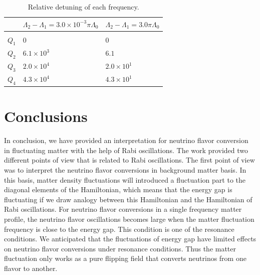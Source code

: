 \documentclass[%
reprint,
 amsmath,amssymb,
 prd,
]{revtex4-1}
\begin{document}

\begin{table}
\caption{\label{tab-q-values-each-mode}Relative detuning of each frequency.} 
\begin{ruledtabular} 
\begin{tabular}{lll} 
  & $\Lambda_2-\Lambda_1 = 3.0\times 10^{-3}\pi\Lambda_0$ & $\Lambda_2-\Lambda_1 =3.0\pi\Lambda_0$ \\
\hline \\
 $Q_1$ & $0$ &  $0$ \\ 
 $Q_2$ & $6.1\times 10^3$ &  $6.1$ \\ 
 $Q_3$ & $2.0\times 10^4$ &  $2.0\times 10^1$ \\ 
 $Q_4$ & $4.3\times 10^4$ &  $4.3\times 10^1$ 
\end{tabular} 
\end{ruledtabular} 
\end{table}





\section{\label{conclusions}Conclusions}



In conclusion, we have provided an interpretation for neutrino flavor conversion in fluctuating matter with the help of Rabi oscillations. The work provided two different points of view that is related to Rabi oscillations. The first point of view was to interpret the neutrino flavor conversions in background matter basis. In this basis, matter density fluctuations will introduced a fluctuation part to the diagonal elements of the Hamiltonian, which means that the energy gap is fluctuating if we draw analogy between this Hamiltonian and the Hamiltonian of Rabi oscillations. For neutrino flavor conversions in a single frequency matter profile, the neutrino flavor oscillations becomes large when the matter fluctuation frequency is close to the energy gap. This condition is one of the resonance conditions. We anticipated that the fluctuations of energy gap have limited effects on neutrino flavor conversions under resonance conditions. Thus the matter fluctuation only works as a pure flipping field that converts neutrinos from one flavor to another. 
\end{document}
